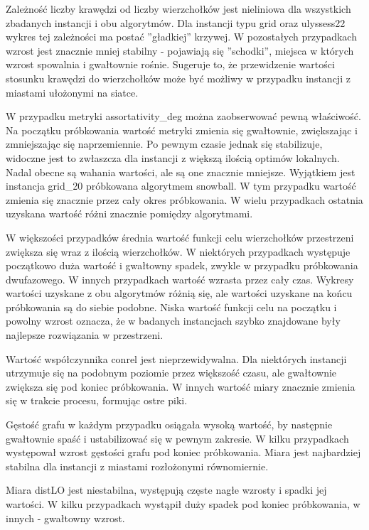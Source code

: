 Zależność liczby krawędzi od liczby wierzchołków jest nieliniowa dla wszystkich zbadanych instancji i obu algorytmów.
Dla instancji typu grid oraz ulyssess22 wykres tej zależności ma postać ''gładkiej'' krzywej.
W pozostałych przypadkach wzrost jest znacznie mniej stabilny - pojawiają się ''schodki'', miejsca w których wzrost
spowalnia i gwałtownie rośnie.
Sugeruje to, że przewidzenie wartości stosunku krawędzi do wierzchołków może być możliwy w przypadku
instancji z miastami ułożonymi na siatce.

W przypadku metryki assortativity\_deg można zaobserwować pewną właściwość.
Na początku próbkowania wartość metryki zmienia się gwałtownie, zwiększając i zmniejszając się naprzemiennie.
Po pewnym czasie jednak się stabilizuje, widoczne jest to zwłaszcza dla instancji z większą ilością optimów lokalnych.
Nadal obecne są wahania wartości, ale są one znacznie mniejsze.
Wyjątkiem jest instancja grid\_20 próbkowana algorytmem snowball.
W tym przypadku wartość zmienia się znacznie przez cały okres próbkowania.
W wielu przypadkach ostatnia uzyskana wartość różni znacznie pomiędzy algorytmami.

W większości przypadków średnia wartość funkcji celu wierzchołków przestrzeni zwiększa się wraz z ilością wierzchołków.
W niektórych przypadkach występuje początkowo duża wartość i gwałtowny spadek, zwykle w przypadku próbkowania dwufazowego.
W innych przypadkach wartość wzrasta przez cały czas.
Wykresy wartości uzyskane z obu algorytmów różnią się, ale wartości uzyskane na końcu próbkowania są do siebie podobne.
Niska wartość funkcji celu na początku i powolny wzrost oznacza, że w badanych instancjach szybko znajdowane były
najlepsze rozwiązania w przestrzeni.

Wartość współczynnika conrel jest nieprzewidywalna.
Dla niektórych instancji utrzymuje się na podobnym poziomie przez większość czasu,
ale gwałtownie zwiększa się pod koniec próbkowania.
W innych wartość miary znacznie zmienia się w trakcie procesu, formując ostre piki.

Gęstość grafu w każdym przypadku osiągała wysoką wartość, by następnie gwałtownie spaść i ustabilizować się w pewnym zakresie.
W kilku przypadkach występował wzrost gęstości grafu pod koniec próbkowania.
Miara jest najbardziej stabilna dla instancji z miastami rozłożonymi równomiernie.

Miara distLO jest niestabilna, występują częste nagłe wzrosty i spadki jej wartości.
W kilku przypadkach wystąpił duży spadek pod koniec próbkowania, w innych - gwałtowny wzrost.

